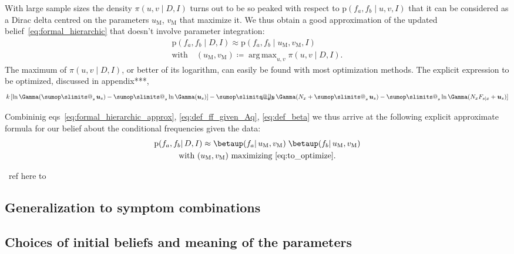 \documentclass[\ifafour a4paper,12pt,\else a5paper,10pt,\fi%
onecolumn,oneside,article,%
british%
]{memoir}
\makeatletter
\theoremstyle{remark}
\theoremstyle{innote}
\def\sum{\DOTSI\sumop\slimits@}
\newcommand*{\citep}{\parencites}
\newcommand*{\defd}{\coloneqq}
\newcommand*{\pf}{\mathrm{p}}%
\renewcommand*{\|}{\mathpunct{|}}
\newcommand*{\eqns}{eqs}%
\newcommand*{\tsum}{\mathop{\textstyle\sum}\nolimits}
\newcommand*{\puzzle}{\maltese}
\newcommand{\mynote}[1]{ {\color{notecolour}\puzzle\ #1}}
\DeclareMathOperator*{\argmax}{arg\,max}
\newcommand*{\yD}{D}
\newcommand*{\yI}{I}
\newcommand*{\ya}{a}
\newcommand*{\yb}{b}
\newcommand*{\dbeta}{\betaup}
\newcommand*{\dA}{\pi}
\newcommand*{\yu}{\bm{u}}
\newcommand*{\yua}{u}
\newcommand*{\yub}{v}
\newcommand*{\yuam}{\yua_{\text{M}}}
\newcommand*{\yubm}{\yub_{\text{M}}}
\newcommand*{\yna}{k}
\makeatother
\begin{document}
With large sample sizes the density $\dA(\yua,\yub \|\yD, \yI)$ turns out to
be so peaked with respect to
$\pf(f_{\ya}, f_{\yb}\| \yua,\yub,\yI)$ that it can be considered
as a Dirac delta centred on the parameters $\yuam$, $\yubm$ that maximize it.
We thus obtain a good approximation of the updated
belief~\eqref{eq:formal_hierarchic} that doesn't involve parameter integration:
\begin{multline}
  \label{eq:formal_hierarchic_approx}
  \pf(f_{\ya}, f_{\yb} \| \yD, \yI) \approx
  \pf(f_{\ya}, f_{\yb}\| \yuam,\yubm,\yI)\\
  \text{with}\quad
  (\yuam,\yubm) \defd \argmax_{\yua,\yub}\dA(\yua,\yub \|\yD, \yI).
\end{multline}
The maximum of $\dA(\yua,\yub \|\yD, \yI)$, or better of its logarithm, can
easily be found with most optimization methods. The explicit expression to
be optimized, discussed in appendix***,
\begin{equation}
  \label{eq:to_optimize}
  \yna\,[\ln\Gamma(\tsum_s\yu_s) - \tsum_s\ln\Gamma(\yu_s)]
  -\sum_{\mathclap{x=\ya,\yb}}
  [\ln\Gamma(N_x+\tsum_s\yu_s) - \tsum_s\ln\Gamma(N_xF_{s\|x}+\yu_s)]
\end{equation}

Combininig \eqns~\eqref{eq:formal_hierarchic_approx},
\eqref{eq:def_ff_given_Aq}, \eqref{eq:def_beta} we thus arrive at the
following explicit approximate formula for our belief about the conditional
frequencies given the data:
\begin{multline}
  \label{eq:formal_hierarchic_approx_final}
  \pf(f_{\ya}, f_{\yb} \| \yD, \yI) \approx
  \dbeta(f_{\ya} \| \yuam,\yubm)\;
  \dbeta(f_{\yb} \| \yuam,\yubm)\\
  \text{with
    $(\yuam,\yubm)$ maximizing~\eqref{eq:to_optimize}}.
\end{multline}




 \mynote{ref here to \citep{mackay1996}}
\subsection{Generalization to symptom combinations}
\label{sec:generalization_symptom_combinations}




\subsection{Choices of initial beliefs and meaning of the parameters}
\label{sec:choices_prior_info}
\end{document}
